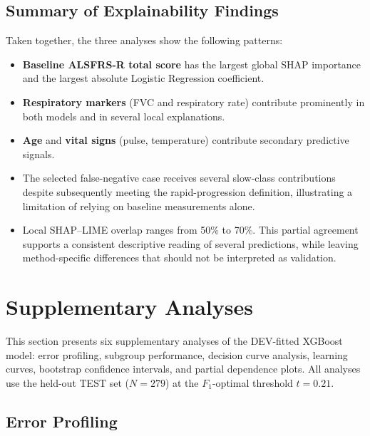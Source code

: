 \subsection{Summary of Explainability Findings}
\label{subsec:results_xai_summary}

Taken together, the three analyses show the following patterns:
\begin{itemize}
  \item \textbf{Baseline ALSFRS-R total score} has the largest global SHAP importance and the largest absolute Logistic Regression coefficient.
  \item \textbf{Respiratory markers} (FVC and respiratory rate) contribute prominently in both models and in several local explanations.
  \item \textbf{Age} and \textbf{vital signs} (pulse, temperature) contribute secondary predictive signals.
  \item The selected false-negative case receives several slow-class contributions despite subsequently meeting the rapid-progression definition, illustrating a limitation of relying on baseline measurements alone.
  \item Local SHAP--LIME overlap ranges from 50\% to 70\%. This partial agreement supports a consistent descriptive reading of several predictions, while leaving method-specific differences that should not be interpreted as validation.
\end{itemize}


\section{Supplementary Analyses}
\label{sec:results_supplementary}

This section presents six supplementary analyses of the DEV-fitted XGBoost model: error profiling, subgroup performance, decision curve analysis, learning curves, bootstrap confidence intervals, and partial dependence plots.
All analyses use the held-out TEST set ($N\!=\!279$) at the $F_1$-optimal threshold $t\!=\!0.21$.

\subsection{Error Profiling}
\label{subsec:results_error_profile}

